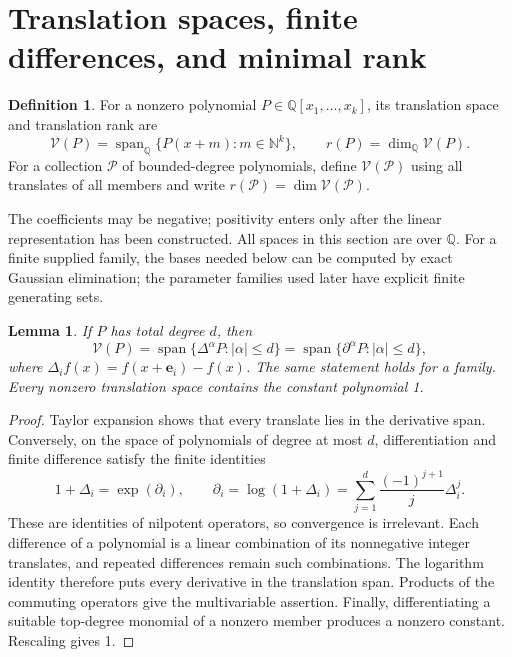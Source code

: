 \documentclass[11pt,letterpaper]{article}
\newtheorem{lemma}[theorem]{Lemma}
\theoremstyle{definition}
\newtheorem{definition}[theorem]{Definition}
\theoremstyle{remark}
\newcommand{\N}{\mathbb N}
\newcommand{\Q}{\mathbb Q}
\newcommand{\e}{\mathbf e}
\newcommand{\Span}{\operatorname{span}}
\newcommand{\calV}{\mathcal V}
\begin{document}
\section{Translation spaces, finite differences, and minimal rank}

\begin{definition}
For a nonzero polynomial $P\in\Q[x_1,\ldots,x_k]$, its translation space and
translation rank are
\[
 \calV(P)=\Span_{\Q}\{P(x+m):m\in\N^k\},\qquad
 r(P)=\dim_{\Q}\calV(P).
\]
For a collection $\mathcal P$ of bounded-degree polynomials, define
$\calV(\mathcal P)$ using all translates of all members and write
$r(\mathcal P)=\dim\calV(\mathcal P)$.
\end{definition}

The coefficients may be negative; positivity enters only after the linear
representation has been constructed. All spaces in this section are over
$\Q$. For a finite supplied family, the bases needed below can be computed by
exact Gaussian elimination; the parameter families used later have explicit
finite generating sets.

\begin{lemma}\label{ste:mx:lem:derivatives}
If $P$ has total degree $d$, then
\begin{equation}\label{ste:mx:eq:spans}
 \calV(P)=\Span\{\Delta^\alpha P:|\alpha|\leq d\}
          =\Span\{\partial^\alpha P:|\alpha|\leq d\},
\end{equation}
where $\Delta_i f(x)=f(x+\e_i)-f(x)$. The same statement holds for a family.
Every nonzero translation space contains the constant polynomial 1.
\end{lemma}
\begin{proof}
Taylor expansion shows that every translate lies in the derivative span.
Conversely, on the space of polynomials of degree at most $d$, differentiation
and finite difference satisfy the finite identities
\[
 1+\Delta_i=\exp(\partial_i),\qquad
 \partial_i=\log(1+\Delta_i)
   =\sum_{j=1}^{d}\frac{(-1)^{j+1}}j\Delta_i^j.
\]
These are identities of nilpotent operators, so convergence is irrelevant.
Each difference of a polynomial is a linear combination of its nonnegative
integer translates, and repeated differences remain such combinations. The
logarithm identity therefore puts every derivative in the translation span.
Products of the commuting operators give the multivariable assertion.
Finally, differentiating a suitable top-degree monomial of a nonzero member
produces a nonzero constant. Rescaling gives 1.
\end{proof}
\end{document}
